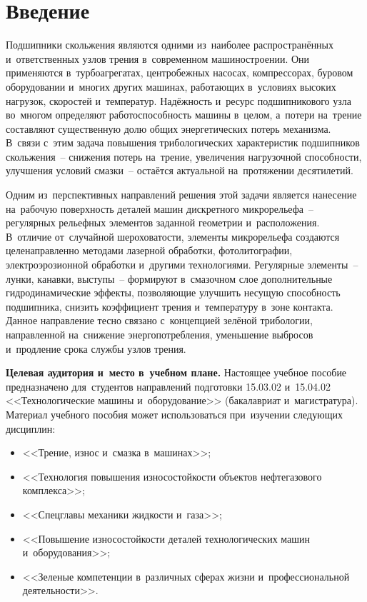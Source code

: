 \chapter*{Введение}

Подшипники скольжения являются одними из~наиболее распространённых и~ответственных узлов трения в~современном машиностроении. Они применяются в~турбоагрегатах, центробежных насосах, компрессорах, буровом оборудовании и~многих других машинах, работающих в~условиях высоких нагрузок, скоростей и~температур. Надёжность и~ресурс подшипникового узла во~многом определяют работоспособность машины в~целом, а~потери на~трение составляют существенную долю общих энергетических потерь механизма. В~связи с~этим задача повышения трибологических характеристик подшипников скольжения~-- снижения потерь на~трение, увеличения нагрузочной способности, улучшения условий смазки~-- остаётся актуальной на~протяжении десятилетий.

Одним из~перспективных направлений решения этой задачи является нанесение на~рабочую поверхность деталей машин дискретного микрорельефа~-- регулярных рельефных элементов заданной геометрии и~расположения. В~отличие от~случайной шероховатости, элементы микрорельефа создаются целенаправленно методами лазерной обработки, фотолитографии, электроэрозионной обработки и~другими технологиями. Регулярные элементы~-- лунки, канавки, выступы~-- формируют в~смазочном слое дополнительные гидродинамические эффекты, позволяющие улучшить несущую способность подшипника, снизить коэффициент трения и~температуру в~зоне контакта. Данное направление тесно связано с~концепцией зелёной трибологии, направленной на~снижение энергопотребления, уменьшение выбросов и~продление срока службы узлов трения.

\textbf{Целевая аудитория и~место в~учебном плане.} Настоящее учебное пособие предназначено для~студентов направлений подготовки 15.03.02 и~15.04.02 <<Технологические машины и~оборудование>> (бакалавриат и~магистратура). Материал учебного пособия может использоваться при~изучении следующих дисциплин:
\begin{itemize}
\item <<Трение, износ и~смазка в~машинах>>;
\item <<Технология повышения износостойкости объектов нефтегазового комплекса>>;
\item <<Спецглавы механики жидкости и~газа>>;
\item <<Повышение износостойкости деталей технологических машин и~оборудования>>;
\item <<Зеленые компетенции в~различных сферах жизни и~профессиональной деятельности>>.
\end{itemize}

